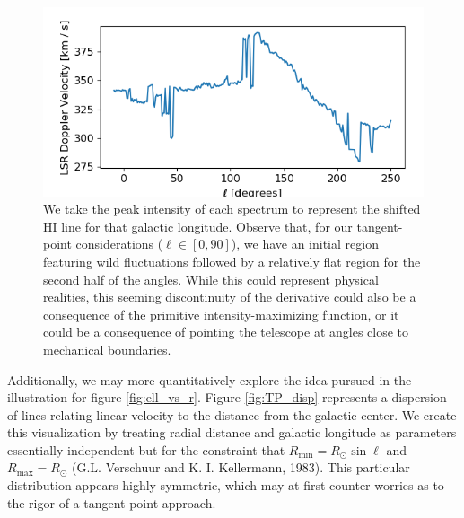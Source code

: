 \documentclass[12pt]{article}
\begin{document}
\begin{figure}
	\centering
	\includegraphics[width=.8\linewidth]{Doppler_collection}
	\caption{We take the peak intensity of each spectrum to represent the shifted HI line for that galactic longitude.  Observe that, for our tangent-point considerations ($\ell \in [0, 90]$), we have an initial region featuring wild fluctuations followed by a relatively flat region for the second half of the angles. While this could represent physical realities, this seeming discontinuity of the derivative could also be a consequence of the primitive intensity-maximizing function, or it could be a consequence of pointing the telescope at angles close to mechanical boundaries.}
	\label{fig:Dopp_collection}
\end{figure}


Additionally, we may more quantitatively explore the idea pursued in the illustration for figure \ref{fig:ell_vs_r}. Figure \ref{fig:TP_disp} represents a dispersion of lines relating linear velocity to the distance from the galactic center. We create this visualization by treating radial distance and galactic longitude as parameters essentially independent but for the constraint that $R_\text{min} = R_\odot \sin \ell$ and $R_\text{max} = R_\odot$ (G.L. Verschuur and K. I. Kellermann, 1983). This particular distribution appears highly symmetric, which may at first counter worries as to the rigor of a tangent-point approach.
\end{document}
